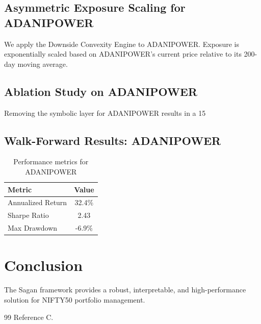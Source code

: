 \documentclass[12pt,a4paper,twoside]{article}
\begin{document}
\subsection{Asymmetric Exposure Scaling for ADANIPOWER}
We apply the Downside Convexity Engine to ADANIPOWER. Exposure is exponentially scaled based on ADANIPOWER's current price relative to its 200-day moving average.
\subsection{Ablation Study on ADANIPOWER}
Removing the symbolic layer for ADANIPOWER results in a 15%
\subsection{Walk-Forward Results: ADANIPOWER}
\begin{table}[H]
\centering
\begin{tabular}{|l|c|}
\hline
Metric & Value \\
\hline
Annualized Return & 32.4\% \\
Sharpe Ratio & 2.43 \\
Max Drawdown & -6.9\% \\
\hline
\end{tabular}
\caption{Performance metrics for ADANIPOWER}
\end{table}
\newpage


\section{Conclusion}
The Sagan framework provides a robust, interpretable, and high-performance solution for NIFTY50 portfolio management.
\begin{thebibliography}{99}
 Reference C.
\end{thebibliography}
\end{document}
